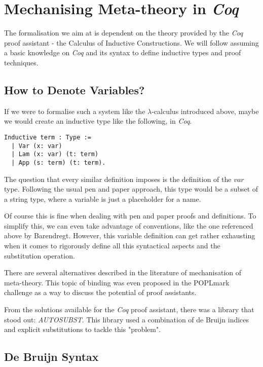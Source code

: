 
\section{Mechanising Meta-theory in \textit{Coq}}

The formalisation we aim at is dependent on the theory provided by the \textit{Coq} proof assistant - the Calculus of Inductive Constructions.
We will follow assuming a basic knowledge on \textit{Coq} and its syntax to define inductive types and proof techniques.

\subsection{How to Denote Variables?}

If we were to formalise such a system like the $\lambda$-calculus introduced above, maybe we would create an inductive type like the following, in \textit{Coq}.

\begin{lstlisting}[language=Coq]
  Inductive term : Type :=
  | Var (x: var)
  | Lam (x: var) (t: term)
  | App (s: term) (t: term).
\end{lstlisting}

The question that every similar definition imposes is the definition of the $var$ type. Following the usual pen and paper approach, this type would be a subset of a string type, where a variable is just a placeholder for a name.

Of course this is fine when dealing with pen and paper proofs and definitions. To simplify this, we can even take advantage of conventions, like the one referenced above by Barendregt. 
However, this variable definition can get rather exhausting  when it comes to rigorously define all this syntactical aspects and the substitution operation.

There are several alternatives described in the literature of mechanisation of meta-theory. 
This topic of binding was even proposed in the POPLmark challenge as a way to discuss the potential of proof assistants.

From the solutions available for the \textit{Coq} proof assistant, there was a library that stood out: \textit{AUTOSUBST}. 
This library used a combination of de Bruijn indices and explicit substitutions to tackle this "problem".


\subsection{De Bruijn Syntax}

